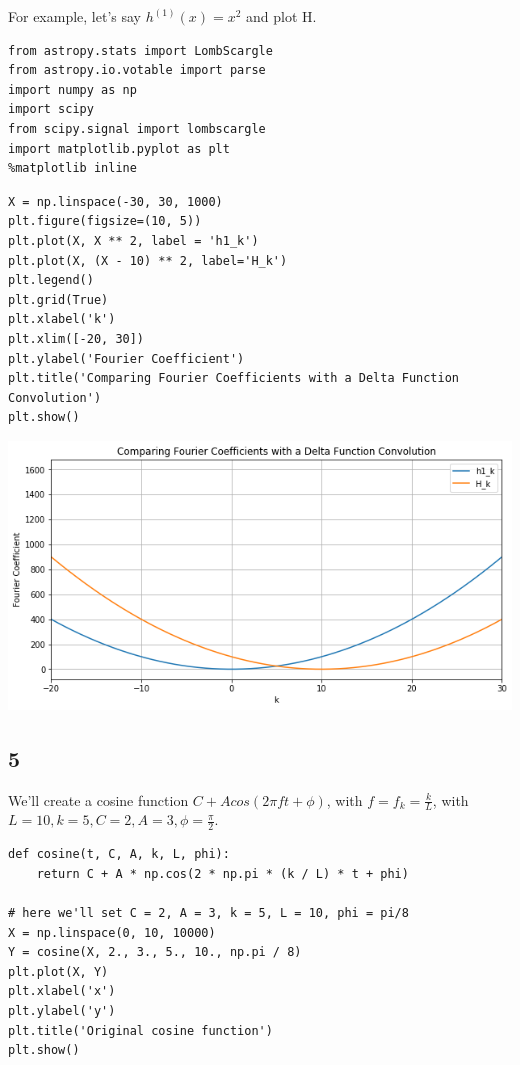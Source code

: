 \documentclass[11pt]{article}
\begin{document}
For example, let's say $h^{(1)}(x) = x^2$ and plot H.

\begin{verbatim}
from astropy.stats import LombScargle
from astropy.io.votable import parse
import numpy as np
import scipy
from scipy.signal import lombscargle
import matplotlib.pyplot as plt
%matplotlib inline
\end{verbatim}


\begin{verbatim}
X = np.linspace(-30, 30, 1000)
plt.figure(figsize=(10, 5))
plt.plot(X, X ** 2, label = 'h1_k')
plt.plot(X, (X - 10) ** 2, label='H_k')
plt.legend()
plt.grid(True)
plt.xlabel('k')
plt.xlim([-20, 30])
plt.ylabel('Fourier Coefficient')
plt.title('Comparing Fourier Coefficients with a Delta Function Convolution')
plt.show()
\end{verbatim}

\includegraphics[width=.9\linewidth]{./obipy-resources/333Doe.png}


\subsection*{5}
\label{sec-1-5}

We'll create a cosine function $C + A cos(2 \pi f t + \phi)$, with $f = f_k =
\frac{k}{L}$, with $L = 10, k = 5, C = 2, A = 3, \phi = \frac{\pi}{2}$.


\begin{verbatim}
def cosine(t, C, A, k, L, phi):
    return C + A * np.cos(2 * np.pi * (k / L) * t + phi)

# here we'll set C = 2, A = 3, k = 5, L = 10, phi = pi/8
X = np.linspace(0, 10, 10000)
Y = cosine(X, 2., 3., 5., 10., np.pi / 8)
plt.plot(X, Y)
plt.xlabel('x')
plt.ylabel('y')
plt.title('Original cosine function')
plt.show()
\end{verbatim}
\end{document}
